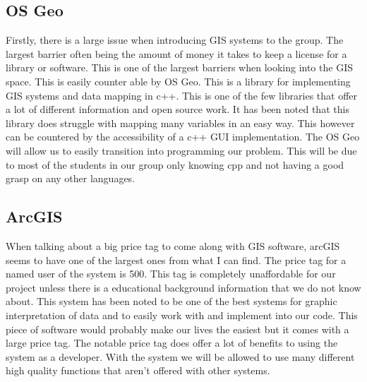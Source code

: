 \documentclass[onecolumn, draftclsnofoot,10pt, compsoc]{IEEEtran}
\begin{document}
      \subsection{OS Geo}
        Firstly, there is a large issue when introducing GIS systems to the group. The largest barrier often being the amount of money it takes to keep a license for a library or software. This is one of the largest barriers when looking into the GIS space. This is easily counter able by OS Geo. This is a library for implementing GIS systems and data mapping in c++. This is one of the few libraries that offer a lot of different information and open source work. It has been noted that this library does struggle with mapping many variables in an easy way. This however can be countered by the accessibility of a c++ GUI implementation. The OS Geo will allow us to easily transition into programming our problem. This will be due to most of the students in our group only knowing cpp and not having a good grasp on any other languages. 
      \subsection{ArcGIS}
        When talking about a big price tag to come along with GIS software, arcGIS seems to have one of the largest ones from what I can find. The price tag for a named user of the system is 500. This tag is completely unaffordable for our project unless there is a educational background information that we do not know about. This system has been noted to be one of the best systems for graphic interpretation of data and to easily work with and implement into our code. This piece of software would probably make our lives the easiest but it comes with a large price tag. The notable price tag does offer a lot of benefits to using the system as a developer. With the system we will be allowed to use many different high quality functions that aren't offered with other systems.
\end{document}
